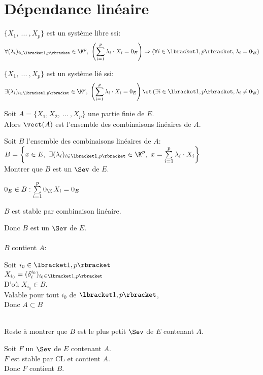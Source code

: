 \documentclass[12pt,twoside,a4paper]{article}
\begin{document}
	\section{D\'ependance lin\'eaire}
		\begin{defi}
			$\{X_1,\ ...\ ,X_p \}$ est un syst\`eme libre ssi:
			$$\forall(\lambda_i)_{i\in\lbracket1,p\rbracket}\in\K^p,\ \left( \sum\limits_{i=1}^p\lambda_i\cdot X_i=0_E\right) \Rightarrow \left(  \forall i\in\lbracket1,p\rbracket, \lambda_i=0_\K\right) $$
		\end{defi}
		\begin{defi}
			$\{X_1,\ ...\ ,X_p \}$ est un syst\`eme li\'e ssi:
			$$\exists(\lambda_i)_{i\in\lbracket1,p\rbracket}\in\K^p,\ \left( \sum\limits_{i=1}^p\lambda_i\cdot X_i=0_E\right) \et \left(  \exists i\in\lbracket1,p\rbracket, \lambda_i\neq 0_\K\right) $$
		\end{defi}
		\begin{prop}
			Soit $A=\{X_1,X_2,\ ...\ ,X_p \}$ une partie finie de $E$.\\
			Alors $\vect(A)$ est l'ensemble des combinaisons lin\'eaires de $A$.
		\end{prop}
		\begin{preuve}
			Soit $B$ l'ensemble des combinaisons lin\'eaires de $A$:\\
			$B=\left\lbrace x\in E,\ \exists (\lambda_i)_{i\in\lbracket1,p\rbracket}\in\K^{p},\ x=\sum\limits_{i=1}^{p}\lambda_i \cdot X_i\right\rbrace $\\
			Montrer que $B$ est un $\Sev$ de $E$.
			\begin{liste}
				\item $0_E\in B: \sum\limits_{i=1}^p0_\K\,X_i=0_E$
				\item $B$ est stable par combinaison lin\'eaire.
			\end{liste}
			Donc $B$ est un $\Sev$ de $E$.\\
			\\
			$B$ contient $A$:
			\begin{tab}
				Soit $i_0\in\lbracket1,p\rbracket$\\
				$X_{i_0}=(\delta^{i_0}_i)_{i_0\in\lbracket1,p\rbracket}$\\
				D'o\`u $X_{i_0}\in B$.\\
				Valable pour tout $i_0$ de $\lbracket1,p\rbracket$,\\
				Donc $A\subset B$
			\end{tab}\ \\
			Reste \`a montrer que $B$ est le plus petit $\Sev$ de $E$ contenant $A$.
			\begin{tab}
				Soit $F$ un $\Sev$ de $E$ contenant $A$.\\
				$F$ est stable par CL et contient $A$.\\
				Donc $F$ contient $B$.
			\end{tab}
		\end{preuve}
\end{document}

